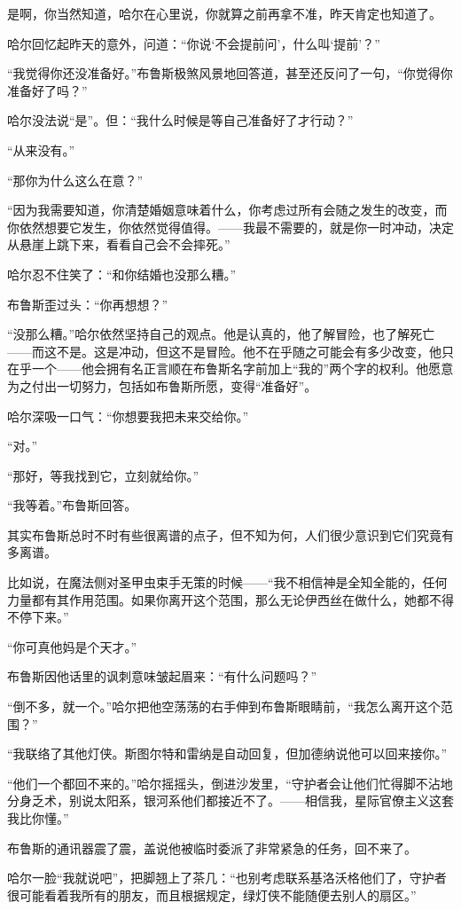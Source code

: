 \documentclass[../main]{subfiles}
\begin{document}
是啊，你当然知道，哈尔在心里说，你就算之前再拿不准，昨天肯定也知道了。

哈尔回忆起昨天的意外，问道：“你说`不会提前问'，什么叫`提前'？”

“我觉得你还没准备好。”布鲁斯极煞风景地回答道，甚至还反问了一句，“你觉得你准备好了吗？”

哈尔没法说“是”。但：“我什么时候是等自己准备好了才行动？”

“从来没有。”

“那你为什么这么在意？”

“因为我需要知道，你清楚婚姻意味着什么，你考虑过所有会随之发生的改变，而你依然想要它发生，你依然觉得值得。——我最不需要的，就是你一时冲动，决定从悬崖上跳下来，看看自己会不会摔死。”

哈尔忍不住笑了：“和你结婚也没那么糟。”

布鲁斯歪过头：“你再想想？”

“没那么糟。”哈尔依然坚持自己的观点。他是认真的，他了解冒险，也了解死亡——而这不是。这是冲动，但这不是冒险。他不在乎随之可能会有多少改变，他只在乎一个——他会拥有名正言顺在布鲁斯名字前加上“我的”两个字的权利。他愿意为之付出一切努力，包括如布鲁斯所愿，变得“准备好”。

哈尔深吸一口气：“你想要我把未来交给你。”

“对。”

“那好，等我找到它，立刻就给你。”

“我等着。”布鲁斯回答。

其实布鲁斯总时不时有些很离谱的点子，但不知为何，人们很少意识到它们究竟有多离谱。

比如说，在魔法侧对圣甲虫束手无策的时候——“我不相信神是全知全能的，任何力量都有其作用范围。如果你离开这个范围，那么无论伊西丝在做什么，她都不得不停下来。”

“你可真他妈是个天才。”

布鲁斯因他话里的讽刺意味皱起眉来：“有什么问题吗？”

“倒不多，就一个。”哈尔把他空荡荡的右手伸到布鲁斯眼睛前，“我怎么离开这个范围？”

“我联络了其他灯侠。斯图尔特和雷纳是自动回复，但加德纳说他可以回来接你。”

“他们一个都回不来的。”哈尔摇摇头，倒进沙发里，“守护者会让他们忙得脚不沾地分身乏术，别说太阳系，银河系他们都接近不了。——相信我，星际官僚主义这套我比你懂。”

布鲁斯的通讯器震了震，盖说他被临时委派了非常紧急的任务，回不来了。

哈尔一脸“我就说吧”，把脚翘上了茶几：“也别考虑联系基洛沃格他们了，守护者很可能看着我所有的朋友，而且根据规定，绿灯侠不能随便去别人的扇区。”
\end{document}
